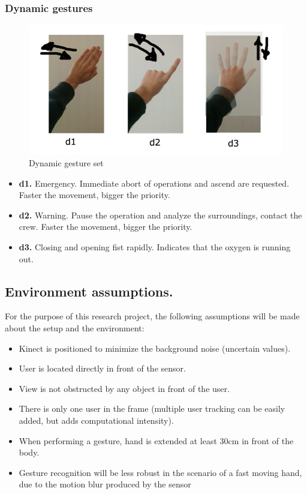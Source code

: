 \documentclass[a4paper,11pt,oneside]{article}
\begin{document}
    \subsubsection{Dynamic gestures}

  \begin{figure}[H]
  \centering
  \includegraphics[scale=0.5]{dynamic-gestureset.png}
  \caption{Dynamic gesture set}
  \end{figure}
  
  \begin{itemize}
    \item \textbf{d1.} Emergency. Immediate abort of operations and ascend are requested. Faster the movement, bigger the priority.
    \item \textbf{d2.} Warning. Pause the operation and analyze the surroundings, contact the crew. Faster the movement, bigger the priority.
    \item \textbf{d3.} Closing and opening fist rapidly. Indicates that the oxygen is running out.
    \end{itemize}

\subsection{Environment assumptions.}

  For the purpose of this research project, the following assumptions will be made about the setup and the environment:\\
  
  \begin{itemize}
 \item Kinect is positioned to minimize the background noise (uncertain values).
  \item User is located directly in front of the sensor.
  \item View is not obstructed by any object in front of the user.
  \item There is only one user in the frame (multiple user tracking can be easily added, but adds computational intensity).
  \item When performing a gesture, hand is extended at least 30cm in front of the body.
\item Gesture recognition will be less robust in the scenario of a fast moving hand, due to the motion blur produced by the sensor
  \end{itemize}
\end{document}
